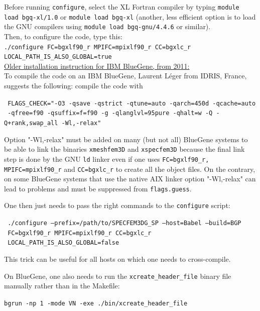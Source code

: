 \documentclass[oneside,english]{book}
\begin{document}
\noindent
Before running \texttt{configure}, select the XL Fortran compiler by typing \texttt{module load bgq-xl/1.0}
or \texttt{module load bgq-xl} (another, less efficient option is to load the GNU compilers using \texttt{module load bgq-gnu/4.4.6} or similar).\\

\noindent
Then, to configure the code, type this:\\

\noindent
\texttt{./configure FC=bgxlf90\_r MPIFC=mpixlf90\_r CC=bgxlc\_r LOCAL\_PATH\_IS\_ALSO\_GLOBAL=true}\\

\noindent
\underline{Older installation instruction for IBM BlueGene, from 2011:}\\

\noindent
To compile the code on an IBM BlueGene, Laurent L\'eger from IDRIS, France, suggests the following: compile the code with

\noindent
\texttt{   FLAGS\_CHECK="-O3 -qsave -qstrict -qtune=auto -qarch=450d -qcache=auto \\}
\texttt{   -qfree=f90 -qsuffix=f=f90 -g -qlanglvl=95pure -qhalt=w -Q -Q+rank,swap\_all -Wl,-relax"}

\noindent
Option "-Wl,-relax" must be added on many (but not all) BlueGene systems to be able to link the binaries \texttt{xmeshfem3D}
and \texttt{xspecfem3D} because the final link step is done by the GNU \texttt{ld} linker even if
one uses \texttt{FC=bgxlf90\_r, MPIFC=mpixlf90\_r} and \texttt{CC=bgxlc\_r} to create all the object files.
On the contrary, on some BlueGene systems that use the native AIX linker option "-Wl,-relax" can lead to problems and must be suppressed from \texttt{flags.guess}.

\noindent
One then just needs to pass the right commands to the \texttt{configure} script:

\noindent
\texttt{   ./configure --prefix=/path/to/SPECFEM3DG\_SP --host=Babel --build=BGP \\}
\texttt{      FC=bgxlf90\_r MPIFC=mpixlf90\_r CC=bgxlc\_r  \\}
\texttt{      LOCAL\_PATH\_IS\_ALSO\_GLOBAL=false}

\noindent
This trick can be useful for all hosts on which one needs to cross-compile.

\noindent
On BlueGene, one also needs to run the \texttt{xcreate\_header\_file} binary file manually rather than in the Makefile:

\noindent
   \texttt{bgrun -np 1 -mode VN -exe ./bin/xcreate\_header\_file}
\end{document}
